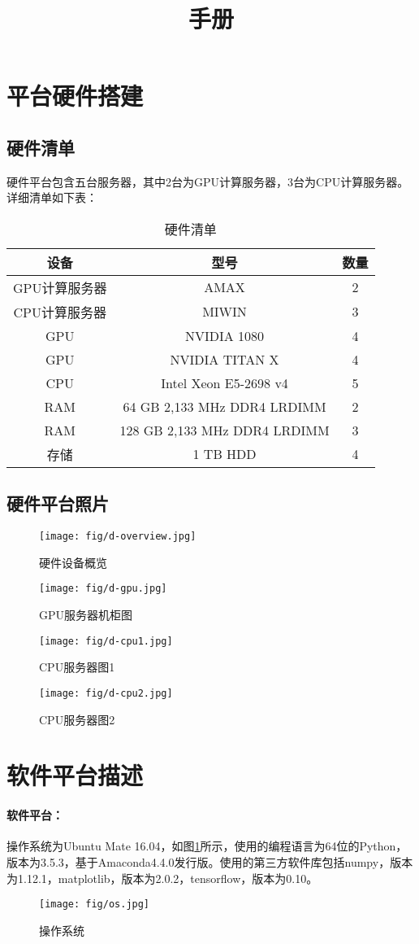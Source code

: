 \documentclass{article}
\begin{document}
\title{手册}
\maketitle
\newpage
\tableofcontents
\newpage


\section{平台硬件搭建}

\subsection{硬件清单}
硬件平台包含五台服务器，其中2台为GPU计算服务器，3台为CPU计算服务器。详细清单如下表：

\begin{table}[h]
\centering
\caption{硬件清单}
\begin{tabular}{ccc}
\hline\hline
设备&型号&数量\\\hline
GPU计算服务器&AMAX&2\\
CPU计算服务器&MIWIN&3\\
GPU&NVIDIA 1080&4\\
GPU&NVIDIA TITAN X&4\\
CPU&Intel Xeon E5-2698 v4&5\\
RAM&64 GB 2,133 MHz DDR4 LRDIMM&2\\
RAM&128 GB 2,133 MHz DDR4 LRDIMM&3\\
存储&1 TB HDD&4\\
\hline\hline
\end{tabular}
\end{table}

\subsection{硬件平台照片}
\begin{figure}
\texttt{[image: fig/d-overview.jpg]}
\caption{硬件设备概览}
\end{figure}

\begin{figure}
\texttt{[image: fig/d-gpu.jpg]}
\caption{GPU服务器机柜图}
\end{figure}

\begin{figure}
\texttt{[image: fig/d-cpu1.jpg]}
\caption{CPU服务器图1}
\end{figure}

\begin{figure}
\texttt{[image: fig/d-cpu2.jpg]}
\caption{CPU服务器图2}
\end{figure}


\section{软件平台描述}
\paragraph{软件平台：}操作系统为Ubuntu Mate 16.04，如图\ref{os}所示，使用的编程语言为64位的Python，版本为3.5.3，基于Amaconda4.4.0发行版。使用的第三方软件库包括numpy，版本为1.12.1，matplotlib，版本为2.0.2，tensorflow，版本为0.10。



\begin{figure}
\texttt{[image: fig/os.jpg]}
\caption{操作系统}
\label{os}
\end{figure}
\end{document}
